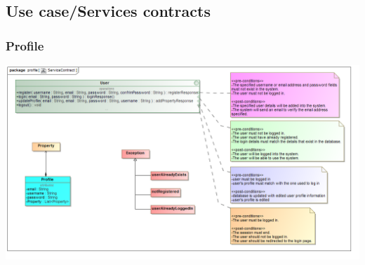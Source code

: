 \documentclass[a4paper,12pt]{article}
\begin{document}

\subsection{Use case/Services contracts}
\subsubsection{Profile}
	\includegraphics[width=1\textwidth]{./Images/newDiagrams/serviceContract/ServiceContract.png}

\end{document}

